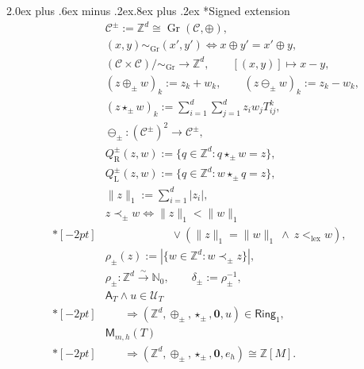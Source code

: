 \documentclass[10pt,a5paper]{article}
\makeatletter
\renewcommand\section{\@startsection{section}{1}{\z@}%
  {2.0ex plus .6ex minus .2ex}{.8ex plus .2ex}%
  {\normalfont\large\bfseries}}
\makeatother
\begin{document}
\section*{Signed extension}
\begin{align*}
&\mathcal C^{\pm}:=\mathbb Z^d
\cong
\operatorname{Gr}(\mathcal C,\oplus),
\\
&(x,y)\sim_{\mathrm{Gr}}(x',y')
\iff
x\oplus y'=x'\oplus y,
\\
&(\mathcal C\times\mathcal C)/{\sim_{\mathrm{Gr}}}
\longrightarrow
\mathbb Z^d,
\qquad
[(x,y)]\longmapsto x-y,
\\
&(z\oplus_{\pm}w)_k:=z_k+w_k,
\qquad
(z\ominus_{\pm}w)_k:=z_k-w_k,
\\
&(z\star_{\pm}w)_k
:=
\sum_{i=1}^{d}\sum_{j=1}^{d}
z_iw_jT_{ij}^{k},
\\
&\ominus_{\pm}:
(\mathcal C^{\pm})^2\longrightarrow\mathcal C^{\pm},
\\
&Q_{\mathrm R}^{\pm}(z,w)
:=
\{q\in\mathbb Z^d:q\star_{\pm}w=z\},
\\
&Q_{\mathrm L}^{\pm}(z,w)
:=
\{q\in\mathbb Z^d:w\star_{\pm}q=z\},
\\
&\|z\|_1:=\sum_{i=1}^{d}|z_i|,
\\
&z\prec_{\pm}w
\iff
\|z\|_1<\|w\|_1
\\*[-2pt]
&\hspace{71pt}\lor
\left(
\|z\|_1=\|w\|_1
\ \land\
z<_{\mathrm{lex}}w
\right),
\\
&\rho_{\pm}(z)
:=
|\{w\in\mathbb Z^d:w\prec_{\pm}z\}|,
\\
&\rho_{\pm}:\mathbb Z^d
\overset{\sim}{\longrightarrow}\mathbb N_0,
\qquad
\delta_{\pm}:=\rho_{\pm}^{-1},
\\
&\mathsf A_T\land u\in\mathcal U_T
\\*[-2pt]
&\hspace{20pt}\Longrightarrow
(\mathbb Z^d,\oplus_{\pm},\star_{\pm},\mathbf0,u)
\in\mathsf{Ring}_1,
\\
&\mathsf M_{m,h}(T)
\\*[-2pt]
&\hspace{20pt}\Longrightarrow
(\mathbb Z^d,\oplus_{\pm},\star_{\pm},\mathbf0,e_h)
\cong
\mathbb Z[M].
\end{align*}

\end{document}
